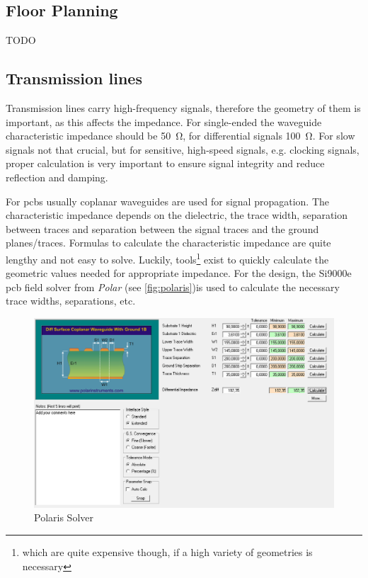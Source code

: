 \subsection{Floor Planning}
TODO
\subsection{Transmission lines}

Transmission lines carry high-frequency signals, therefore the geometry of them is important, as this affects the impedance. For single-ended the waveguide characteristic impedance should be \SI{50}{\ohm}, for differential signals \SI{100}{\ohm}. For slow signals not that crucial, but for sensitive, high-speed signals, e.g. clocking signals, proper calculation is very important to ensure signal integrity and reduce reflection and damping. 

For \glspl{pcb} usually coplanar waveguides are used for signal propagation. The characteristic impedance depends on the dielectric, the trace width, separation between traces and separation between the signal traces and the ground planes/traces. Formulas to calculate the characteristic impedance are quite lengthy and not easy to solve. Luckily, tools\footnote{which are quite expensive though, if a high variety of geometries is necessary} exist to quickly calculate the geometric values needed for appropriate impedance. For the design, the Si9000e \gls{pcb} field solver from \textit{Polar} (see \autoref{fig:polaris})is used to calculate the necessary trace widths, separations, etc.

\begin{figure}[tbh]
	\centering
	\includegraphics[width = \textwidth]{chap/04-work/img/polaris}
	\caption{Polaris Solver}
	\label{fig:polaris}
\end{figure}

